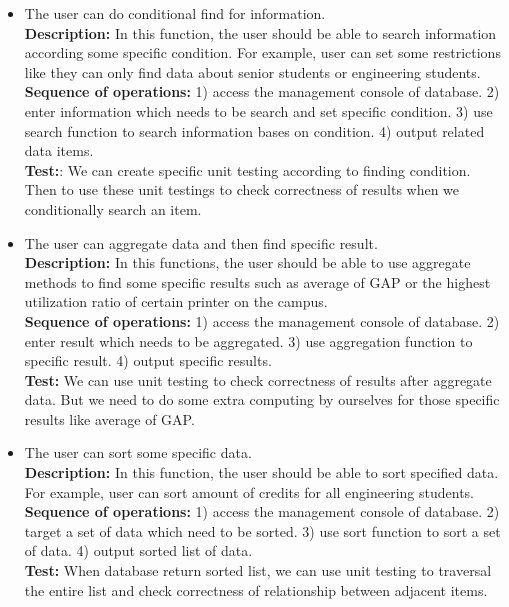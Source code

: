 \begin{itemize}
        \item The user can do conditional find for information.\\
        \textbf{Description:} In this function, the user should be able to search information according some specific condition. For example, user can set some restrictions like they can only find data about senior students or engineering students.\\
        \textbf{Sequence of operations:} 1) access the management console of database. 2) enter information which needs to be search and set specific condition. 3) use search function to search information bases on condition. 4) output related data items.\\
        \textbf{Test:}: We can create specific unit testing according to finding condition. Then to use these unit testings to check correctness of results when we conditionally search an item.\\
        
        \item The user can aggregate data and then find specific result.\\
       	\textbf{Description:} In this functions, the user should be able to use aggregate methods to find some specific results such as average of GAP or the highest utilization ratio of certain printer on the campus.\\
        \textbf{Sequence of operations:} 1) access the management console of database. 2) enter result which needs to be aggregated. 3) use aggregation function to specific result. 4) output specific results.\\
        \textbf{Test:} We can use unit testing to check correctness of results after aggregate data. But we need to do some extra computing by ourselves for those specific results like average of GAP.\\
        
        \item The user can sort some specific data.\\
        \textbf{Description:} In this function, the user should be able to sort specified data. For example, user can sort amount of credits for all engineering students.\\
        \textbf{Sequence of operations:} 1) access the management console of database. 2) target a set of data which need to be sorted. 3) use sort function to sort a set of data. 4) output sorted list of data.\\
        \textbf{Test:} When database return sorted list, we can use unit testing to traversal the entire list and check correctness of relationship between adjacent items.
    \end{itemize}
	
